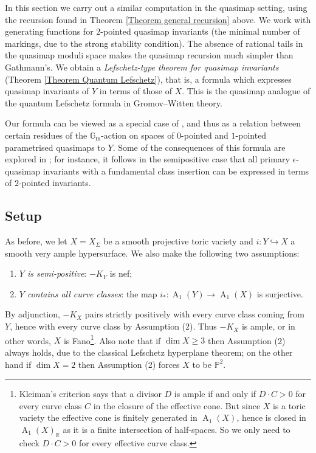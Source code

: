 \documentclass[11pt]{amsart}
\newcommand{\PP}{\mathbb P}
\renewcommand{\to}{\rightarrow}
\newcommand{\Gm}{\mathbb{G}_{\text{m}}}
\newcommand{\Achow}{\operatorname{A}}
\theoremstyle{definition}
\theoremstyle{definition}
\begin{document}
In this section we carry out a similar computation in the quasimap setting, using the recursion found in Theorem \ref{Theorem general recursion} above. We work with generating functions for $2$-pointed quasimap invariants (the minimal number of markings, due to the strong stability condition). The absence of rational tails in the quasimap moduli space makes the quasimap recursion much simpler than Gathmann's. We obtain a \emph{Lefschetz-type theorem for quasimap invariants} (Theorem \ref{Theorem Quantum Lefschetz}), that is, a formula which expresses quasimap invariants of $Y$ in terms of those of $X$. This is the quasimap analogue of the quantum Lefschetz formula in Gromov--Witten theory.

Our formula can be viewed as a special case of \cite[Corollary 5.5.1]{CF-K-wallcrossing}, and thus as a relation between certain residues of the $\Gm$-action on spaces of $0$-pointed and $1$-pointed parametrised quasimaps to $Y$. Some of the consequences of this formula are explored in \cite[Section 5.5]{CF-K-wallcrossing}; for instance, it follows in the semipositive case that all primary $\epsilon$-quasimap invariants with a fundamental class insertion can be expressed in terms of $2$-pointed invariants.

\subsection{Setup} \label{Subsection setup}
As before, we let $X=X_{\Sigma}$ be a smooth projective toric variety and $i \colon Y \hookrightarrow X$ a smooth very ample hypersurface. We also make the following two assumptions:
\begin{enumerate}
\item \emph{$Y$ is semi-positive}: $-K_Y$ is nef;
\item \emph{$Y$ contains all curve classes}: the map $i_* : \Achow_1(Y) \to \Achow_1(X)$ is surjective.
\end{enumerate}
By adjunction, $-K_X$ pairs strictly positively with every curve class coming from $Y$, hence with every curve class by Assumption (2). Thus $-K_X$ is ample, or in other words, $X$ is Fano\footnote{Kleiman's criterion says that a divisor $D$ is ample if and only if $D \cdot C > 0$ for every curve class $C$ in the closure of the effective cone. But since $X$ is a toric variety the effective cone is finitely generated in $\Achow_1(X)$, hence is closed in $\Achow_1(X)_{\mathbb{R}}$ as it is a finite intersection of half-spaces. So we only need to check $D \cdot C > 0$ for every effective curve class.}. Also note that if $\dim X \geq 3$ then Assumption (2) always holds, due to the classical Lefschetz hyperplane theorem; on the other hand if $\dim X = 2$ then Assumption (2) forces $X$ to be $\PP^2$.
\end{document}
